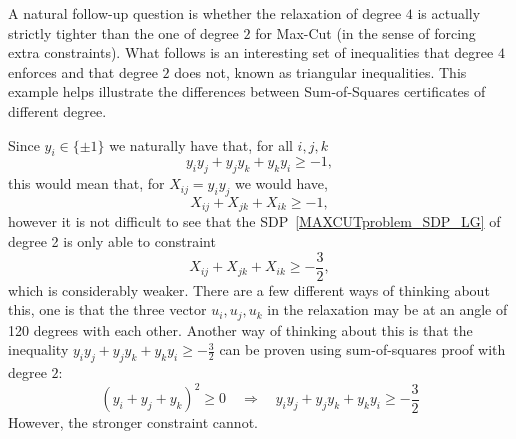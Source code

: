 \begin{remark}\label{remark:9:SOS4MaxCut}
A natural follow-up question is whether the relaxation of degree $4$ is actually strictly tighter than the one of degree $2$ for Max-Cut (in the sense of forcing extra constraints). What follows is an interesting set of inequalities that degree $4$ enforces and that degree $2$ does  not, known as triangular inequalities. This example helps illustrate the differences between Sum-of-Squares certificates of different degree.

Since $y_i\in \{\pm 1\}$ we naturally have that, for all $i,j,k$
\[
y_iy_j + y_jy_k + y_ky_i \geq -1,
\]
this would mean that, for $X_{ij} = y_iy_j$ we would have,
\[
X_{ij} + X_{jk} + X_{ik} \geq -1,
\]
however it is not difficult to see that the SDP~\eqref{MAXCUTproblem_SDP_LG} of degree 2 is only able to constraint
\[
X_{ij} + X_{jk} + X_{ik} \geq -\frac32,
\]
which is considerably weaker. There are a few different ways of thinking about this, one is that the three vector $u_i,u_j,u_k$ in the relaxation may be at an angle of 120 degrees with each other. Another way of thinking about this is that
the inequality $y_iy_j + y_jy_k + y_ky_i \geq -\frac32$ can be proven using sum-of-squares proof with degree $2$:
\[
(y_i+y_j+y_k)^2 \geq 0 \quad  \Rightarrow \quad y_iy_j + y_jy_k + y_ky_i \geq -\frac32
\]
However, the stronger constraint cannot.


\end{remark}
